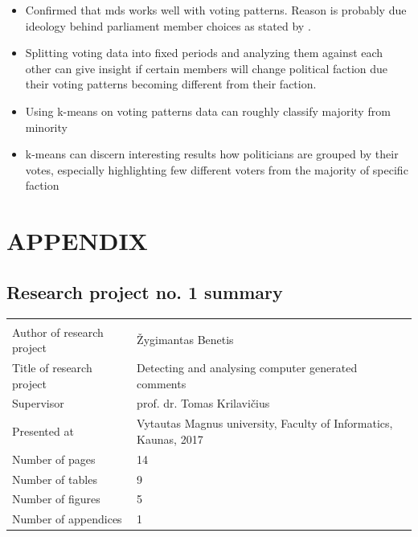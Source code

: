 \documentclass[a4paper,12pt]{article}
\begin{document}
   	
   	\begin{itemize}
    	\item Confirmed that \acrfull{mds} works well with voting patterns. Reason is probably due ideology behind parliament member choices as stated by \cite{poole_2005}.
    	\item Splitting voting data into fixed periods and analyzing them against each other can give insight if certain members will change political faction due their voting patterns becoming different from their faction.
    	\item Using \gls{k-means} on voting patterns data can roughly classify majority from minority
    	\item \gls{k-means} can discern interesting results how politicians are grouped by their votes, especially highlighting few different voters from the majority of specific faction
    \end{itemize}
   
    \clearpage
    
    {}
    
        
    \clearpage
    
      
	\appendix
	\section{APPENDIX}
	
	\subsection{Research project no. 1 summary}
	

	   		\noindent
	\begin{center}
		\begin{tabular}{L{4.5cm} L{8cm}}
			\\ 
			Author of research project & Žygimantas Benetis \\
			Title of research project & Detecting and analysing computer generated comments\\
			Supervisor & prof. dr. Tomas Krilavičius\\
			Presented at & Vytautas Magnus university, Faculty of Informatics, Kaunas, 2017\\
			Number of pages & 14\\
			Number of tables & 9\\
			Number of figures & 5\\
			Number of appendices & 1\\
		\end{tabular}
	\end{center} 
\end{document}
